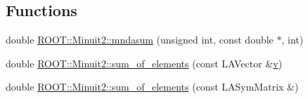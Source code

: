 \subsection*{Functions}
\begin{DoxyCompactItemize}
\item 
double \mbox{\hyperlink{namespaceROOT_1_1Minuit2_a6945787dc86a55296d0de1bf1fefc508}{R\+O\+O\+T\+::\+Minuit2\+::mndasum}} (unsigned int, const double $\ast$, int)
\item 
double \mbox{\hyperlink{namespaceROOT_1_1Minuit2_a30e3cb02f21de446d5a4611ef1e8becd}{R\+O\+O\+T\+::\+Minuit2\+::sum\+\_\+of\+\_\+elements}} (const L\+A\+Vector \&\mbox{\hyperlink{adat__devel_2lib_2hadron_2hadron__timeslice_8cc_a716fc87f5e814be3ceee2405ed6ff22a}{v}})
\item 
double \mbox{\hyperlink{namespaceROOT_1_1Minuit2_a9beed1d87603a5fd4c04f65e1f7b7cf7}{R\+O\+O\+T\+::\+Minuit2\+::sum\+\_\+of\+\_\+elements}} (const L\+A\+Sym\+Matrix \&)
\end{DoxyCompactItemize}
